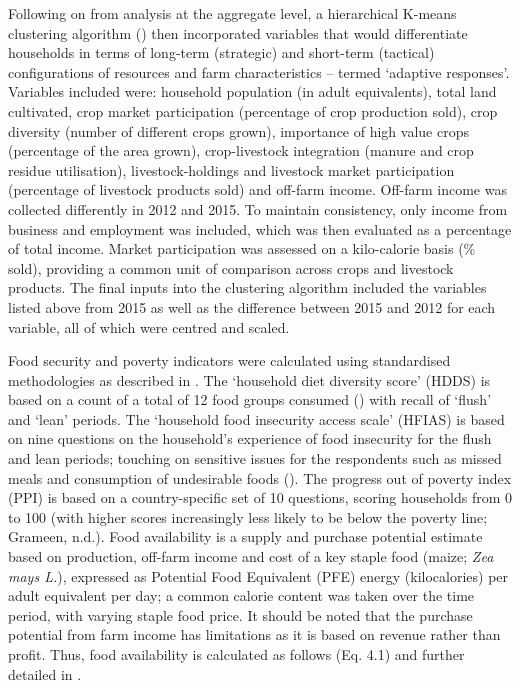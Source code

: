 Following on from analysis at the aggregate level, a hierarchical K-means clustering algorithm (\citealp{Kassambara2016}) then incorporated variables that would differentiate households in terms of long-term (strategic) and short-term (tactical) configurations of resources and farm characteristics -- termed `adaptive responses'. Variables included were: household population (in adult equivalents), total land cultivated, crop market participation (percentage of crop production sold), crop diversity (number of different crops grown), importance of high value crops (percentage of the area grown), crop-livestock integration (manure and crop residue utilisation), livestock-holdings and livestock market participation (percentage of livestock products sold) and off-farm income. Off-farm income was collected differently in 2012 and 2015. To maintain consistency, only income from business and employment was included, which was then evaluated as a percentage of total income. Market participation was assessed on a kilo-calorie basis (\% sold), providing a common unit of comparison across crops and livestock products. The final inputs into the clustering algorithm included the variables listed above from 2015 as well as the difference between 2015 and 2012 for each variable, all of which were centred and scaled.

Food security and poverty indicators were calculated using standardised methodologies as described in \citet{Hammond2017225}. The `household diet diversity score' (HDDS) is based on a count of a total of 12 food groups consumed (\citealp{Swindale2006}) with recall of `flush' and `lean' periods. The `household food insecurity access scale' (HFIAS) is based on nine questions on the household's experience of food insecurity for the flush and lean periods; touching on sensitive issues for the respondents such as missed meals and consumption of undesirable foods (\citealp{Coates2007}). The progress out of poverty index (PPI) is based on a country-specific set of 10 questions, scoring households from 0 to 100 (with higher scores increasingly less likely to be below the poverty line; Grameen, n.d.). Food availability is a supply and purchase potential estimate based on production, off-farm income and cost of a key staple food (maize; \textit{Zea mays L.}), expressed as Potential Food Equivalent (PFE) energy (kilocalories) per adult equivalent per day; a common calorie content was taken over the time period, with varying staple food price. It should be noted that the purchase potential from farm income has limitations as it is based on revenue rather than profit. Thus, food availability is calculated as follows (Eq. 4.1) and further detailed in \citet{Frelat2016458}.

